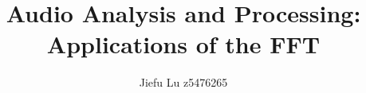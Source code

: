 \documentclass[11pt]{article}
\title{Audio Analysis and Processing: Applications of the FFT}
\author{Jiefu Lu z5476265}
\begin{document}
\maketitle
    
    \pagebreak
    
    \pagebreak
    
    \pagebreak
    
    \pagebreak
\end{document}
